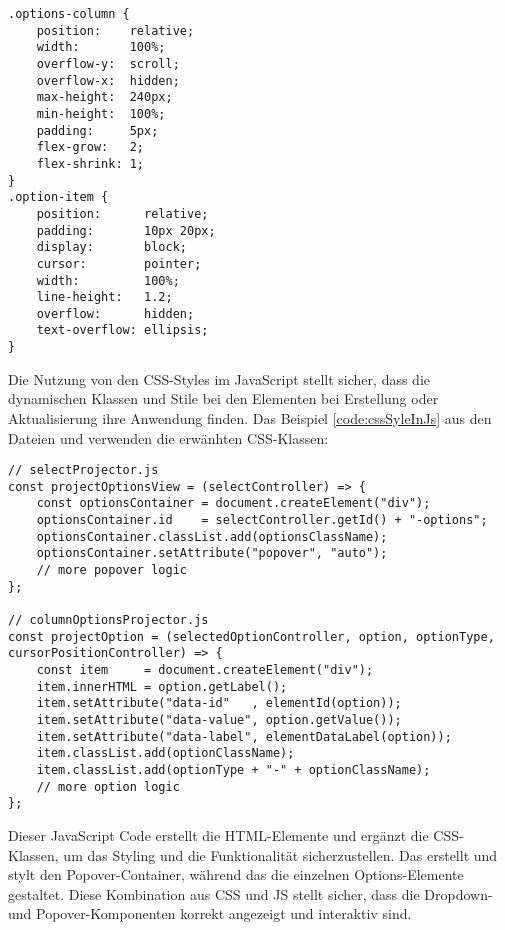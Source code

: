\begin{lstlisting}[style = htmlcssjs, caption = Optionen und Scrollbar-Styling, label = code:optionStyling]
.options-column {
    position:    relative;
    width:       100%;
    overflow-y:  scroll;
    overflow-x:  hidden;
    max-height:  240px;
    min-height:  100%;
    padding:     5px;
    flex-grow:   2;
    flex-shrink: 1;
}
.option-item {
    position:      relative;
    padding:       10px 20px;
    display:       block;
    cursor:        pointer;
    width:         100%;
    line-height:   1.2;
    overflow:      hidden;
    text-overflow: ellipsis;
} 
\end{lstlisting}

Die Nutzung von den CSS-Styles im JavaScript stellt sicher, dass die dynamischen Klassen und Stile bei den Elementen bei Erstellung oder Aktualisierung ihre Anwendung finden.
Das Beispiel \ref{code:cssSyleInJs} aus den Dateien  und  verwenden die erwänhten CSS-Klassen:

\begin{lstlisting}[style = htmlcssjs, caption = CSS-Styles im JavaScript, label = code:cssSyleInJs]
// selectProjector.js
const projectOptionsView = (selectController) => {
    const optionsContainer = document.createElement("div");
    optionsContainer.id    = selectController.getId() + "-options";
    optionsContainer.classList.add(optionsClassName);
    optionsContainer.setAttribute("popover", "auto");
    // more popover logic
};

// columnOptionsProjector.js
const projectOption = (selectedOptionController, option, optionType, cursorPositionController) => {
    const item     = document.createElement("div");
    item.innerHTML = option.getLabel();
    item.setAttribute("data-id"   , elementId(option));
    item.setAttribute("data-value", option.getValue());
    item.setAttribute("data-label", elementDataLabel(option));
    item.classList.add(optionClassName);
    item.classList.add(optionType + "-" + optionClassName);
    // more option logic
}; 
\end{lstlisting}

Dieser JavaScript Code erstellt die HTML-Elemente und ergänzt die CSS-Klassen, um das Styling und die Funktionalität sicherzustellen. 
Das  erstellt und stylt den Popover-Container, während das  die einzelnen Options-Elemente gestaltet.
Diese Kombination aus CSS und JS stellt sicher, dass die Dropdown- und Popover-Komponenten korrekt angezeigt und interaktiv sind.


